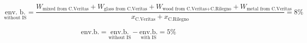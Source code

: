 \begin{equation*}
    \underset{\text{without IS}}{\text{env. b.}} = \frac{W_{\text{mixed from C.Veritas}} + W_{\text{glass from C.Veritas}} + W_{\text{wood from C.Veritas+C.Rilegno}} + W_{\text{metal from C.Veritas}}}{x_{\text{C.Veritas}} + x_{\text{C.Rilegno}}} = 8\%
\end{equation*}

\begin{equation*}
    \text{env.b.} = \underset{\text{without IS}}{\text{env.b.}} - \underset{\text{with IS}}{\text{env.b.}} = 5\%
\end{equation*}